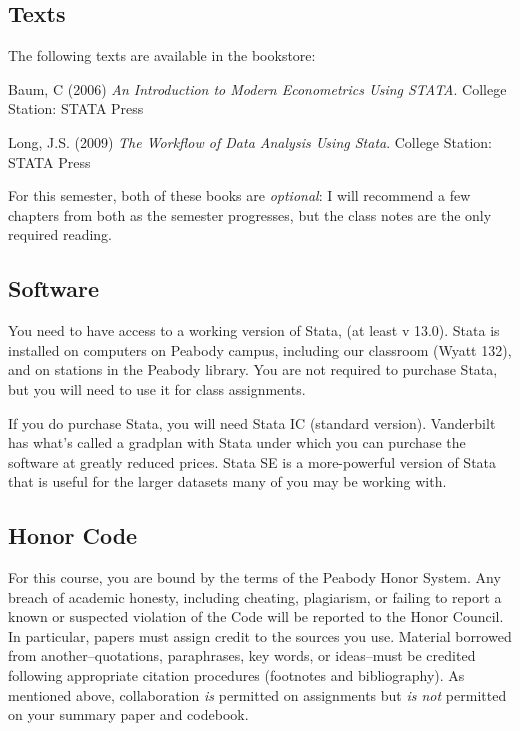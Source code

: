 \documentclass[12pt]{article}
\begin{document}
\subsection{Texts}%

\begin{flushleft}

The following texts are available in the bookstore:

Baum, C (2006) \textit{An Introduction to Modern Econometrics Using
STATA}. College Station: STATA Press

Long, J.S. (2009) \textit{The Workflow of Data Analysis Using Stata}. College Station: STATA Press

For this semester, both of these books are \textit{optional}: I will
recommend a few chapters from both as the semester progresses, but the
class notes are the only required reading. 

\end{flushleft}

\subsection{Software}

You need to have access to a working version of Stata, (at least v 13.0).
Stata is installed on computers on Peabody campus, including our
classroom (Wyatt 132), and on stations in the Peabody library. You
are not required to purchase Stata, but you will need to use it for
class assignments.

If you do purchase Stata, you will need Stata IC (standard
version). Vanderbilt has what's called a gradplan with Stata under
which you can purchase the software at greatly reduced prices.  Stata
SE is a more-powerful version of Stata that is useful for the larger
datasets many of you may be working with.


\subsection{Honor Code}
\label{sec:honor-code}

For this course, you are bound by the terms of the Peabody Honor
System. Any breach of academic honesty, including cheating,
plagiarism, or failing to report a known or suspected violation of the
Code will be reported to the Honor Council. In particular, papers must
assign credit to the sources you use. Material borrowed from
another--quotations, paraphrases, key words, or ideas--must be
credited following appropriate citation procedures (footnotes and
bibliography). As mentioned above, collaboration \textit{is} permitted
on assignments but \textit{is not} permitted on your summary paper and
codebook. 
 
\end{document}
